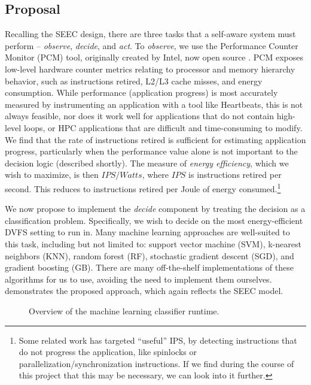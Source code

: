 \subsection{Proposal}

Recalling the SEEC design, there are three tasks that a self-aware system must perform -- \emph{observe}, \emph{decide}, and \emph{act}.
To \emph{observe}, we use the Performance Counter Monitor (PCM) tool, originally created by Intel, now open source \cite{PCMGit}.
PCM exposes low-level hardware counter metrics relating to processor and memory hierarchy behavior, such as instructions retired, L2/L3 cache misses, and energy consumption.
While performance (\ie application progress) is most accurately measured by instrumenting an application with a tool like Heartbeats, this is not always feasible, nor does it work well for applications that do not contain high-level loops, or HPC applications that are difficult and time-consuming to modify.
We find that the rate of instructions retired is sufficient for estimating application progress, particularly when the performance value alone is not important to the decision logic (described shortly).
The measure of \emph{energy efficiency}, which we wish to maximize, is then $IPS / Watts$, where $IPS$ is instructions retired per second.
This reduces to instructions retired per Joule of energy consumed.\footnote{Some related work has targeted ``useful'' IPS, by detecting instructions that do not progress the application, like spinlocks or parallelization/synchronization instructions. If we find during the course of this project that this may be necessary, we can look into it further.}

We now propose to implement the \emph{decide} component by treating the decision as a classification problem.
Specifically, we wish to decide on the most energy-efficient DVFS setting to run in.
Many machine learning approaches are well-suited to this task, including but not limited to: support vector machine (SVM), k-nearest neighbors (KNN), random forest (RF), stochastic gradient descent (SGD), and gradient boosting (GB).
There are many off-the-shelf implementations of these algorithms for us to use, avoiding the need to implement them ourselves.
 demonstrates the proposed approach, which again reflects the SEEC model.

\begin{figure}[t]
  \begin{centering}
    
    \caption{Overview of the machine learning classifier runtime.}
    \label{fig:classifier-runtime}
  \end{centering}
\end{figure}

